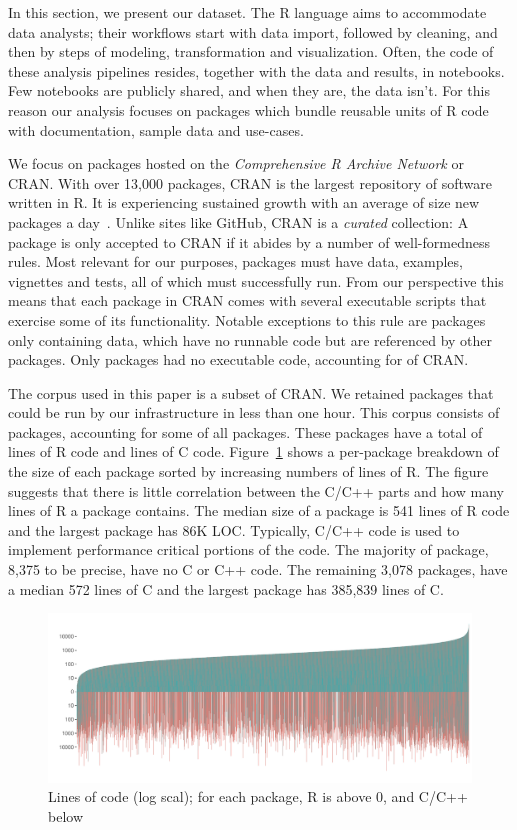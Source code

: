 \documentclass[acmsmall,10pt,review,anonymous]{acmart}\settopmatter{printfolios=true,printccs=false,printacmref=false}
\begin{document}
In this section, we present our dataset. The R language aims to accommodate
data analysts; their workflows start with data import, followed by cleaning,
and then by steps of modeling, transformation and visualization. Often, the
code of these analysis pipelines resides, together with the data and
results, in notebooks. Few notebooks are publicly shared, and when they are,
the data isn't. For this reason our analysis focuses on packages which
bundle reusable units of R code with documentation, sample data and
use-cases.

We focus on packages hosted on the \emph{Comprehensive R Archive Network} or
CRAN.  With over 13,000 packages, CRAN is the largest repository of software
written in R. It is experiencing sustained growth with an average of size
new packages a day~\cite{LIgges2017}.  Unlike sites like GitHub, CRAN is a
\emph{curated} collection: A package is only accepted to CRAN if it abides
by a number of well-formedness rules.  Most relevant for our purposes,
packages must have data, examples, vignettes and tests, all of which must
successfully run. From our perspective this means that each package in CRAN
comes with several executable scripts that exercise some of its
functionality.  Notable exceptions to this rule are packages only containing
data, which have no runnable code but are referenced by other packages.
Only \DATAPKGS packages had no executable code, accounting for \DATAPKGSPERC
of CRAN.

The corpus used in this paper is a subset of CRAN. We retained packages that
could be run by our infrastructure in less than one hour. This corpus
consists of \PACKAGES packages, accounting for some \PERCENTCRAN of all
packages.  These packages have a total of \RLOC lines of R code and \CLOC
lines of C code. Figure~\ref{allcloc} shows a per-package breakdown of the
size of each package sorted by increasing numbers of lines of R. The figure
suggests that there is little correlation between the C/C++ parts and how
many lines of R a package contains. The median size of a package is 541
lines of R code and the largest package has 86K LOC. Typically, C/C++ code
is used to implement performance critical portions of the code. The majority
of package, 8,375 to be precise, have no C or C++ code.  The remaining 3,078
packages, have a median 572 lines of C and the largest package has 385,839
lines of C.

\begin{figure}[!b]\begin{center}
\includegraphics[width=.9\textwidth]{linesofrandccode}
\caption{Lines of code (log scal); for each package, R is above 0, and C/C++
  below}\label{allcloc}\end{center}
\end{figure}
\end{document}

